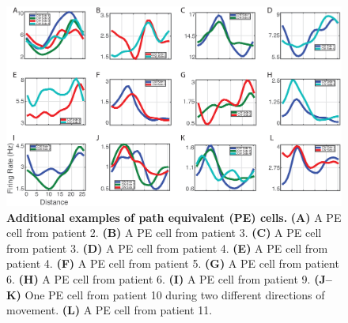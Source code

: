 \clearpage
\begin{figure}[bh]
\centering
\includegraphics[width=1\textwidth]{./tex/linearGrids/figs/supp_extra_cells_large}
\caption[Additional examples of path equivalent (PE) cells]{\textbf{Additional examples of path equivalent (PE) cells.} \textbf{(A)} A PE cell from patient 2. \textbf{(B)} A PE cell from patient 3. \textbf{(C)} A PE cell from patient 3. \textbf{(D)} A PE cell from patient 4. \textbf{(E)} A PE cell from patient 4. \textbf{(F)} A PE cell from patient 5. \textbf{(G)} A PE cell from patient 6. \textbf{(H)} A PE cell from patient 6. \textbf{(I)}  A PE cell from patient 9. \textbf{(J--K)} One PE cell from patient 10 during two different directions of movement. \textbf{(L)}  A PE cell from patient 11.}
\end{figure}

